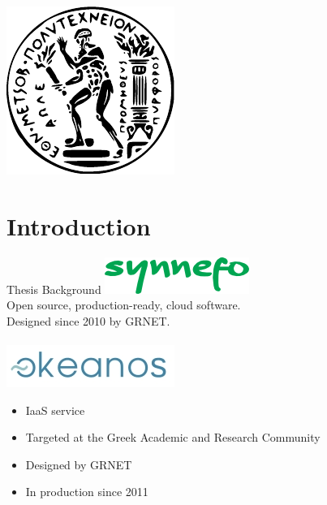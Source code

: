\begin{frame}[plain]
\titlepage
\begin{center}
\includegraphics[scale=0.6]{images/pyrforos.pdf}
\end{center}
\end{frame}


\begin{frame}[t]
\setcounter{tocdepth}{1}
\tableofcontents
\end{frame}

\section{Introduction}
\begin{frame}{Thesis Background}
\includegraphics[height=0.075\textheight]{images/synnefo-logo.png} \\
    Open source, production-ready, cloud software.\\
    Designed since 2010 by GRNET.
\hfill \\
\hfill \\
\includegraphics[height=0.075\textheight]{images/okeanos-logo.png}
    \begin{itemize}
        \item IaaS service
        \item Targeted at the Greek Academic and Research Community
        \item Designed by GRNET
        \item In production since 2011
    \end{itemize}
\end{frame}
